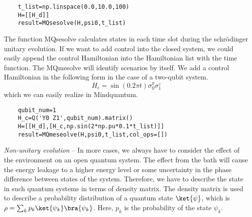 \begin{lstlisting}
    t_list=np.linspace(0.0,10.0,100)
    H=[[H_d]]
    result=MQsesolve(H,psi0,t_list)
\end{lstlisting}
The function MQsesolve calculates states in each time slot during the schrödinger unitary evolution. If we want to add control into the closed system, we could easily append the control Hamiltonian into the Hamiltonian list with the time function. The MQmesolve will identify scenarios by itself. We add a control Hamiltonian in the following form in the case of a two-qubit system.
\begin{equation}
    H_{c}=\sin(0.2\pi t)\sigma_{0}^{y}\sigma_{1}^{z}
\end{equation}
which we can easily realize in Mindquantum.
\begin{lstlisting}
    qubit_num=1
    H_c=Q('Y0 Z1',qubit_num).matrix()
    H=[[H_d],[H_c,np.sin(2*np.pu*0.1*t_list)]]
    result=MQmeseolve(H,psi0,t_list,col_ops=[])
\end{lstlisting}
\textit{Non-unitary evolution} -- In more cases, we always have to consider the effect of the environment on an open quantum system. The effect from the bath will cause the energy leakage to a higher energy level or some uncertainty in the phase difference between states of the system. Therefore, we have to describe the state in such quantum systems in terms of density matrix. The density matrix is used to describe a probability distribution of a quantum state $\ket{\psi}$, which is $\rho=\sum_{k}p_{k}\ket{\psi_{k}}\bra{\psi_{k}}$. Here, $p_k$ is the probability of the state $\psi_k$.

